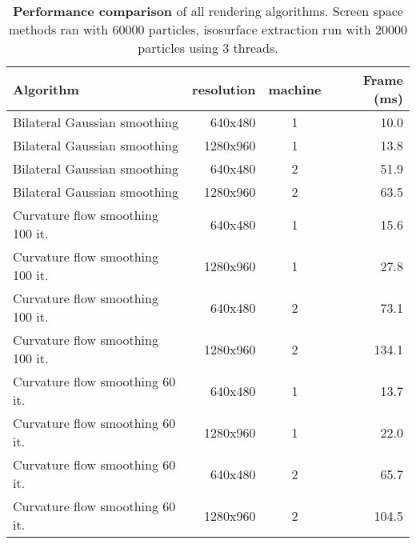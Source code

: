 \begin{table}
   \caption[Performance comparison]{\textbf{Performance comparison} of all rendering algorithms. Screen space methods ran with 60000 particles, isosurface extraction run with 20000 particles using 3 threads.}
   \centering
   \begin{tabular} { l | r | c | r }
      Algorithm                                       &            resolution              &          machine           &          Frame (ms)      \\ \hline \hline
      Bilateral Gaussian smoothing        &           640x480                &              1                  &           10.0                    \\ \hline
      Bilateral Gaussian smoothing        &           1280x960              &              1                  &           13.8                    \\ \hline
      Bilateral Gaussian smoothing        &           640x480                &              2                  &           51.9                    \\ \hline
      Bilateral Gaussian smoothing        &           1280x960              &              2                  &           63.5                    \\ \hline \hline

      Curvature flow smoothing 100 it. &           640x480                &              1                  &           15.6                    \\ \hline
      Curvature flow smoothing 100 it. &          1280x960               &              1                  &           27.8                    \\ \hline
      Curvature flow smoothing 100 it. &           640x480                &              2                  &           73.1                    \\ \hline
      Curvature flow smoothing 100 it. &          1280x960               &              2                  &           134.1                  \\ \hline \hline

      Curvature flow smoothing 60 it.   &           640x480                &              1                  &           13.7                \\ \hline
      Curvature flow smoothing 60 it.   &          1280x960               &              1                  &           22.0                \\ \hline
      Curvature flow smoothing 60 it.   &           640x480                &              2                  &           65.7                    \\ \hline
      Curvature flow smoothing 60 it.   &          1280x960               &              2                  &           104.5               \\ \hline \hline


\end{tabular}
\end{table}
